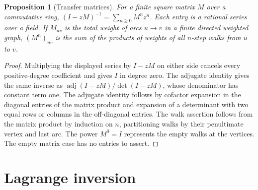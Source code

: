 \documentclass[11pt,oneside,openany]{book}
\theoremstyle{plain}
\newtheorem{proposition}[theorem]{Proposition}
\theoremstyle{definition}
\theoremstyle{remark}
\begin{document}
\begin{proposition}[Transfer matrices]\label{p204:W17}
For a finite square matrix \(M\) over a commutative ring,
\((I-zM)^{-1}=\sum_{n\ge0}M^n z^n\).
Each entry is a rational series over a field. If \(M_{uv}\)
is the total weight of arcs \(u\to v\) in a finite directed
weighted graph, \((M^n)_{uv}\) is the sum of the products
of weights of all \(n\)-step walks from \(u\) to \(v\).
\end{proposition}
\begin{proof}
Multiplying the displayed series by \(I-zM\) on either side
cancels every positive-degree coefficient and gives \(I\)
in degree zero. The adjugate identity gives the same inverse
as \(\operatorname{adj}(I-zM)/\det(I-zM)\), whose denominator
has constant term one. The adjugate identity follows by
cofactor expansion in the diagonal entries of the matrix
product and expansion of a determinant with two equal rows
or columns in the off-diagonal entries. The walk assertion
follows from the matrix product by induction on \(n\),
partitioning walks by their penultimate vertex and last arc.
The power \(M^0=I\) represents the empty walks at the vertices.
The empty matrix case has no entries to assert.
\end{proof}

\section{Lagrange inversion}
\end{document}
